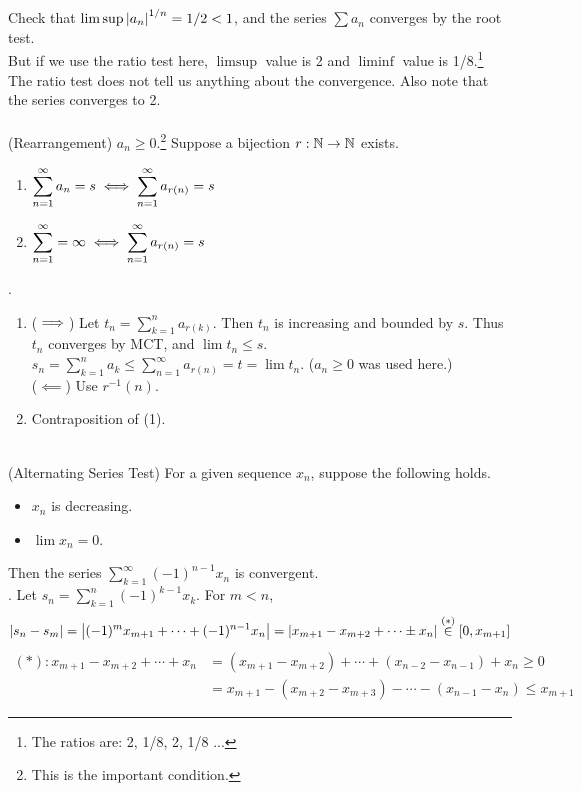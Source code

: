 Check that $\limsup \left|a_n\right|^{1/n} = 1/2 < 1$, and the series $ \sum a_n $ converges by the root test.\\
But if we use the ratio test here, $\limsup$ value is 2 and $\liminf$ value is 1/8.\footnote{The ratios are: 2, 1/8, 2, 1/8 ...} The ratio test does not tell us anything about the convergence. Also note that the series converges to 2.\\
\\
 (Rearrangement) $a_n\geq 0$.\footnote{This is the important condition.} Suppose a bijection $r: \mathbb{N} \rightarrow \mathbb{N}$ exists. 
\begin{enumerate}
	\item $\displaystyle \sum_{n=1}^\infty a_n = s \iff \sum_{n=1}^\infty a_{r(n)} = s$
	\item $\displaystyle \sum_{n=1}^\infty = \infty \iff \sum_{n=1}^\infty a_{r(n)} = s$
\end{enumerate}
\pf.
\begin{enumerate}
	\item ($\implies$) Let $t_n=\sum_{k=1}^n a_{r(k)}$. Then $t_n$ is increasing and bounded by $s$. Thus $t_n$ converges by MCT, and $\lim t_n \leq s$.\\
	$s_n = \sum_{k=1}^n a_k \leq \sum_{n=1}^\infty a_{r(n)} = t = \lim t_n$. ($a_n\geq 0$ was used here.)\\
	($\impliedby$) Use $r^{-1}(n)$. 
	\item Contraposition of (1).
\end{enumerate}~\\
 (Alternating Series Test) For a given sequence $x_n$, suppose the following holds.
\begin{itemize}
	\item $x_n$ is decreasing.
	\item $\lim x_n = 0$.
\end{itemize}
Then the series $\sum_{k=1}^\infty (-1)^{n-1}x_n$ is convergent.\\
\pf. Let $s_n = \sum_{k=1}^n (-1)^{k-1}x_k$. For $m<n$, $$\left|s_n-s_m\right| = \left|(-1)^m x_{m+1} +\cdots + (-1)^{n-1} x_n\right| = \left|x_{m+1} - x_{m+2}+\cdots \pm x_n\right| \overset{(*)}{\in} [0, x_{m+1}]$$
$\begin{aligned}
	(*): x_{m+1} - x_{m+2} + \cdots + x_n &= (x_{m+1} - x_{m+2}) + \cdots + (x_{n-2} - x_{n-1}) + x_n \geq 0\\
	&=x_{m+1} - (x_{m+2} - x_{m+3}) - \cdots -(x_{n-1}-x_n) \leq x_{m+1}
\end{aligned}$ \\
